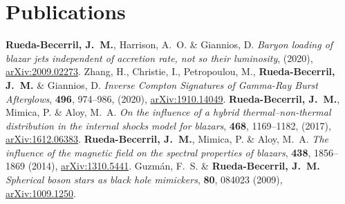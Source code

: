 \section{Publications}

\renewcommand{\refname}{Articles}
\setcounter{num}{0}
\renewcommand{\MyNbOfPub}{5}%
\renewcommand*{\bibliographyitemlabel}{[\arabic{enumiv}]}
\begin{thebibliography}{99}
   \textbf{Rueda-Becerril, J.~M.}, Harrison, A.~O. \& Giannios, D. \textit{Baryon loading of blazar jets independent of accretion rate, not so their luminosity}, %
  (2020), \href{https://arxiv.org/abs/2009.02273}{arXiv:2009.02273}.
   Zhang, H., Christie, I., Petropoulou, M., \textbf{Rueda-Becerril, J.~M.} \& Giannios, D. \textit{Inverse Compton Signatures of Gamma-Ray Burst Afterglows}, \href{https://doi.org/10.1093/mnras/staa1583}{\mnras} \textbf{496}, 974--986, (2020), \href{https://arxiv.org/abs/1910.14049}{arXiv:1910.14049}.
   \textbf{Rueda-Becerril, J.~M.}, Mimica, P. \& Aloy, M.~A. \textit{On the influence of a hybrid thermal--non-thermal distribution in the internal shocks model for blazars}, \href{https://doi.org/10.1093/mnras/stx476}{\mnras} \textbf{468}, 1169--1182, (2017), \href{https://arxiv.org/abs/1612.06383}{arXiv:1612.06383}.
   \textbf{Rueda-Becerril, J.~M.}, Mimica, P. \& Aloy, M.~A. \textit{The influence of the magnetic field on the spectral properties of blazars}, \href{https://doi.org/10.1093/mnras/stt2335}{\mnras} \textbf{438}, 1856--1869 (2014), \href{https://arxiv.org/abs/1310.5441}{arXiv:1310.5441}.
   Guzmán, F.~S. \& \textbf{Rueda-Becerril, J.~M.} \textit{Spherical boson stars as black hole mimickers},  \href{https://doi.org/10.1103/PhysRevD.80.084023}{\prd} \textbf{80}, 084023 (2009), \href{https://arxiv.org/abs/1009.1250}{arXiv:1009.1250}.
\end{thebibliography}

